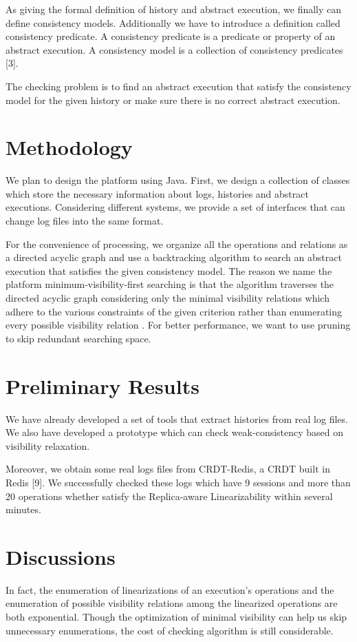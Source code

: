 \documentclass[sigconf,review,screen,anonymous]{acmart}
\begin{document}
As giving the formal definition of history and abstract execution, we finally can define consistency models. Additionally we have to introduce a definition called consistency predicate. A consistency predicate is a predicate or property of an abstract execution. A consistency model is a collection of consistency predicates [3].

The checking problem is to find an abstract execution that satisfy the consistency model for the given history or make sure there is no correct abstract execution.

\section{Methodology}
We plan to design the platform using Java. First, we design a collection of classes which store the necessary information about logs, histories and abstract executions. Considering different systems, we provide a set of interfaces that can change log files into the same format.

For the convenience of processing, we organize all the operations and relations as a directed acyclic graph and use a backtracking algorithm to search an abstract execution that satisfies the given consistency model. The reason we name the platform minimum-visibility-first searching is that the algorithm traverses the directed acyclic graph considering only the minimal visibility relations which adhere to the various constraints of the given criterion rather than enumerating every possible visibility relation . For better performance, we want to use pruning to skip redundant searching space.

\section{Preliminary Results}
We have already developed a set of tools that extract histories from real log files. We also have developed a prototype which can check weak-consistency based on visibility relaxation.

Moreover, we obtain some real logs files from CRDT-Redis, a CRDT built in Redis [9]. We successfully checked these logs which have 9 sessions and more than 20 operations whether satisfy the Replica-aware Linearizability within several minutes.

\section{Discussions}
In fact, the enumeration of linearizations of an execution’s operations and the enumeration of possible visibility relations among the linearized operations are both exponential. Though the optimization of minimal visibility can help us skip unnecessary enumerations, the cost of checking algorithm is still considerable.
\end{document}
